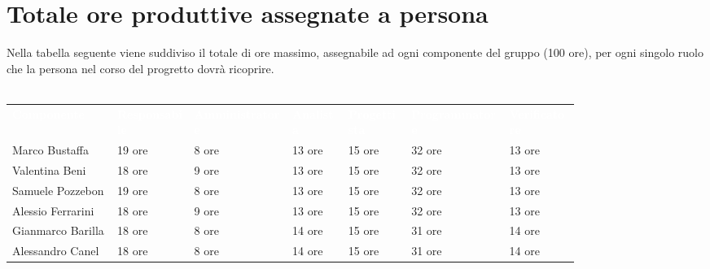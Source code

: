 \section{Totale ore produttive assegnate a persona}
Nella tabella seguente viene suddiviso il totale di ore massimo, assegnabile ad ogni componente del gruppo
(100 ore), per ogni singolo ruolo che la persona nel corso del progretto dovrà ricoprire.\\\\
{\renewcommand{\arraystretch}{1.5}
\scriptsize
\begin{tabular}{p{0.15\linewidth}p{0.11\linewidth}p{0.14\linewidth}p{0.08\linewidth}p{0.09\linewidth}p{0.14\linewidth}p{0.10\linewidth}}
	\rowcolor[RGB]{33, 73, 50}
	\textcolor{white}{\textbf{Componente}} & \textcolor{white}{\textbf{Responsabile}} & \textcolor{white}
	{\textbf{Amministratore}} & \textcolor{white}{\textbf{Analista}} & \textcolor{white}
	{\textbf{Progettista}} & \textcolor{white}{\textbf{Programmatore}} & \textcolor{white}{\textbf{Verificatore}}\\
	\rowcolor[RGB]{216, 235, 171}
	Marco Bustaffa & 19 ore & 8 ore & 13 ore & 15 ore & 32 ore & 13 ore        	\\
	\rowcolor[RGB]{233, 245, 206}
	Valentina Beni & 18 ore & 9 ore & 13 ore & 15 ore & 32 ore & 13 ore        	\\
	\rowcolor[RGB]{216, 235, 171}
	Samuele Pozzebon & 19 ore & 8 ore & 13 ore & 15 ore & 32 ore & 13 ore      	\\
    \rowcolor[RGB]{233, 245, 206}
	Alessio Ferrarini & 18 ore & 9 ore & 13 ore & 15 ore & 32 ore & 13 ore     	\\
    \rowcolor[RGB]{216, 235, 171}
	Gianmarco Barilla & 18 ore & 8 ore & 14 ore & 15 ore & 31 ore & 14 ore     	\\
    \rowcolor[RGB]{233, 245, 206}
	Alessandro Canel & 18 ore & 8 ore & 14 ore & 15 ore & 31 ore & 14 ore    	\\
\end{tabular}	
}